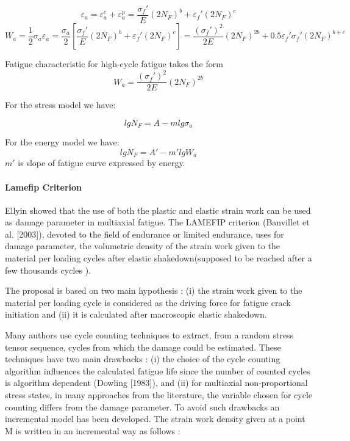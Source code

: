 \documentclass[3p,times,procedia,number]{elsarticle}
\begin{document}
         $$\varepsilon_a=\varepsilon_a^e+\varepsilon_a^p=\frac{\sigma_f'}{E}(2N_F)^b+\varepsilon_f'(2N_F)^c$$
         $$W_a=\frac{1}{2}\sigma_a\varepsilon_a=\frac{\sigma_a}{2}\left[\frac{\sigma_f'}{E}(2N_F)^b+\varepsilon_f'(2N_F)^c\right]=\frac{(\sigma_f')^2}{2E}(2N_F)^{2b}+0.5\varepsilon_f'\sigma_f'(2N_F)^{b+c}$$
         
         Fatigue characteristic for high-cycle fatigue
         takes the form
         $$W_a=\frac{(\sigma_f')^2}{2E}(2N_F)^{2b}$$
         
         For the stress model we have:
         
         $$lgN_F=A-mlg\sigma_a$$
         
         For the energy model we have:
         $$lgN_F=A'-m'lgW_a$$
         $m'$ is slope of fatigue curve
         expressed by energy.

\paragraph{Lamefip Criterion}
Ellyin\cite{ellyin2012fatigue} showed that the use of both the plastic and elastic strain work can be used
as damage parameter in multiaxial fatigue. The LAMEFIP criterion (Banvillet et al. [2003]\cite{banvillet2003volumetric}),
devoted to the field of endurance or limited endurance, uses for damage parameter, the volumetric density of the strain work given to the material per loading cycles after elastic shakedown(supposed to be reached after a few thousands cycles ).

The proposal is based on two main hypothesis : (i) the strain work given to the material per loading cycle is considered as the driving force for fatigue crack initiation and (ii) it is calculated after macroscopic elastic shakedown.

Many authors use cycle counting techniques to extract, from a random stress tensor sequence, cycles from which the damage could be estimated. These techniques have two main drawbacks : (i) the choice of the cycle counting algorithm influences the calculated fatigue life since the number of counted cycles is algorithm dependent (Dowling [1983]\cite{dowling1983fatigue}), and (ii) for multiaxial non-proportional stress states, in many approaches from the literature, the variable chosen for cycle counting differs from the damage parameter. To avoid such drawbacks an incremental model has been developed. The strain work density given at a point M is written in an incremental way as follows :
\end{document}
